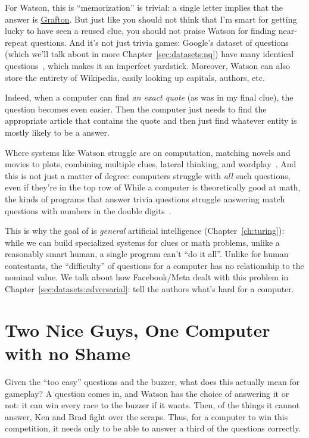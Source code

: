 For Watson, this is ``memorization'' is trivial: a single letter
implies that the answer is \underline{Grafton}.
%
But just like you should not think that I'm smart for getting lucky to
have seen a reused clue, you should not praise Watson for finding
near-repeat questions.
%
And it's not just trivia games: Google's dataset of questions (which
we'll talk about in more Chapter~\ref{sec:datasets:nq}) have
many identical questions~\citep{lewis-21}, which makes it an imperfect yardstick.
%
Moreover, Watson can also store the entirety of Wikipedia, easily
looking up capitals, authors, etc.

Indeed, when a computer can find \emph{an exact quote} (as was in my
final \jeopardy{} clue), the question becomes even easier.
%
Then the computer just needs to find the appropriate article that
contains the quote and then just find whatever entity is mostly likely
to be a \jeopardy{} answer.

Where systems like Watson struggle are on computation, matching novels
and movies to plots, combining multiple clues, lateral thinking, and
wordplay~\citep{kaushik-18}.
%
And this is not just a matter of degree: computers struggle with \emph{all}
such questions, even if they're in the top row of \jeopardyf{}
%
While a computer is theoretically good at math, the kinds of programs
that answer trivia questions struggle answering match questions with
numbers in the double digits~\citep{wallace-19:numbers}.

This is why the goal of  is \emph{general} artificial
intelligence (Chapter~\ref{ch:turing}): while we can build specialized
systems for \jeopardy{} clues or math problems, unlike a
reasonably smart human, a single program can't ``do it all''.
%
Unlike for human contestants, the ``difficulty'' of \jeopardy{}
questions for a computer has no relationship to the nominal value.
%
We talk about how Facebook/Meta dealt with this problem in
Chapter~\ref{sec:datasets:adversarial}: tell the authors what's hard for a computer.

\section{Two Nice Guys, One Computer with no Shame}
\label{sec:watson:strategy}


Given the ``too easy'' questions and the buzzer, what does this
actually mean for gameplay?
%
A question comes in, and Watson has the choice of answering it or not:
it can win every race to the buzzer if it wants.
%
Then, of the things it cannot answer, Ken and Brad fight over the
scraps.
%
Thus, for a computer to win this competition, it needs only to be able
to answer a third of the questions correctly.


